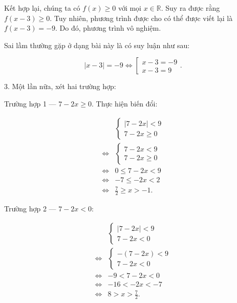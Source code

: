 Kết hợp lại, chúng ta có $f(x) \geq 0$ với mọi $x \in \mathbb{R}$. Suy ra được rằng $f(x - 3) \geq 0$. Tuy nhiên, phương trình được cho có thể được viết lại là $f(x - 3) = -9$. Do đó, phương trình vô nghiệm.

Sai lầm thường gặp ở dạng bài này là có suy luận như sau:

\begin{equation*}
   |x - 3| = -9 \iff \left[\begin{array}{l}
      x - 3 = -9 \\
      x - 3 = 9
   \end{array}\right..
\end{equation*}

3. Một lần nữa, xét hai trường hợp:

\textcolor{colorEmphasisCyan}{Trường hợp 1 --- $7 - 2x \geq 0$}. Thực hiện biến đổi:

\begin{align*}
   &\begin{cases}
      |7 - 2x| < 9 \\
      7 - 2x \geq 0
   \end{cases} \\
   \iff &\begin{cases}
      7 - 2x < 9 \\
      7 - 2x \geq 0
   \end{cases} \\
   \iff &0 \leq 7 - 2x < 9 \\
   \iff &-7 \leq -2x < 2 \\
   \iff &\frac{7}{2} \geq x > -1.
\end{align*}

\textcolor{colorEmphasis}{Trường hợp 2 --- $7 - 2x < 0$}:

\begin{align*}
   &\begin{cases}
      |7 - 2x| < 9 \\
      7 - 2x < 0
   \end{cases} \\
   \iff &\begin{cases}
      - (7 - 2x) < 9 \\
      7 - 2x < 0
   \end{cases} \\
   \iff & -9 < 7 - 2x < 0 \\
   \iff & -16 < -2x < -7 \\
   \iff & 8 > x > \frac{7}{2}.
\end{align*}

